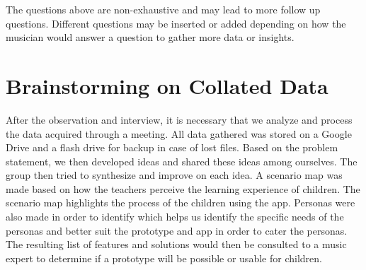The questions above are non-exhaustive and may lead to more follow up questions. Different questions may be inserted or added depending on how the musician would answer a question to gather more data or insights.

\section{Brainstorming on Collated Data}
After the observation and interview, it is necessary that we analyze and process the data acquired through a meeting. All data gathered was stored on a Google Drive and a flash drive for backup in case of lost files. Based on the problem statement, we then developed ideas and shared these ideas among ourselves. The group then tried to synthesize and improve on each idea. A scenario map was made based on how the teachers perceive the learning experience of children. The scenario map highlights the process of the children using the app. Personas were also made in order to identify which helps us identify the specific needs of the personas and better suit the prototype and app in order to cater the personas. The resulting list of features and solutions would then be consulted to a music expert to determine if a prototype will be possible or usable for children.


